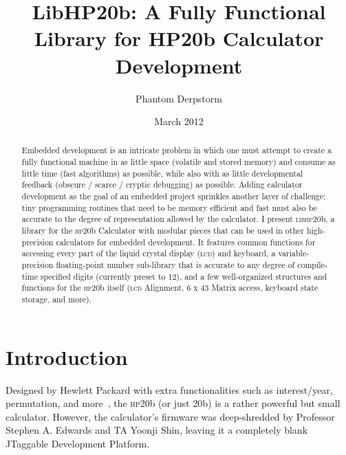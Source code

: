 \documentclass{LibHP20b}
\title{LibHP20b:
A Fully Functional Library for HP20b Calculator Development}
\author{Phantom Derpstorm}
\date{March 2012}
\begin{document}
\newcommand{\HP}[1][libhp]{\textsc{#1}20b}
\newcommand{\LCD}{\textsc{lcd}}
\newcommand{\RPN}{\textsc{rpn}}
\newcommand{\Sev}{\textsc{s}7}
\newcommand{\Col}[2]{{\color{#1} #2}}
\newcommand{\CWord}[1]{\texttt{#1}}
\newcommand{\CKey}[1]{{\color{blue} \texttt{#1}}}
\newcommand{\CMem}[2]{{\color{blue} \texttt{#1}.}{\color{salmonpink} \texttt{#2}}}
\newcommand{\CPMem}[2]{{\color{blue} \texttt{#1}->}{\color{salmonpink} \texttt{#2}}}
\newcommand{\CFun}[1]{{\color{funccolor} \texttt{#1}}}
\newcommand{\HPButton}[1]{{\color{buttoncolor} \texttt{[ #1 ]}}}
\maketitle

\begin{abstract}

Embedded development is an intricate problem in which one must attempt to create a fully functional machine in as little space (volatile and stored memory) and consume as little time (fast algorithms) as possible, while also with as little developmental feedback (obscure / scarce / cryptic debugging) as possible.
Adding calculator development as the goal of an embedded project sprinkles another layer of challenge; tiny programming routines that need to be memory efficient and fast must also be accurate to the degree of representation allowed by the calculator.
I present \HP, a library for the \HP[hp] Calculator with modular pieces that can be used in other high-precision calculators for embedded development. It features common functions for accessing every part of the liquid crystal display (\LCD) and keyboard, a variable-precision floating-point number sub-library that is accurate to any degree of compile-time specified digits (currently preset to 12), and a few well-organized structures and functions for the \HP[hp] itself (\LCD{} Alignment, 6 x 43 Matrix access,  keyboard state storage, and more).

\end{abstract}

\section{Introduction}
Designed by Hewlett Packard with extra functionalities such as interest/year, permutation, and more~\cite{hp20bmanual}, the \HP[hp] (or just \HP[]) is a rather powerful but small calculator. However, the calculator's firmware was deep-shredded by Professor Stephen A. Edwards and TA Yoonji Shin, leaving it a completely blank JTaggable Development Platform.
\end{document}
